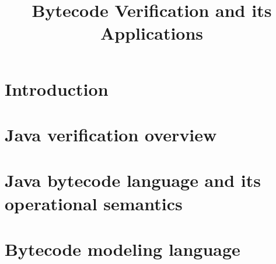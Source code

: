 \documentclass[book,10pt]{book}
\title{Bytecode Verification and its Applications}
\begin{document}
    \lstset{language=Jml}
    \lstset{frameround=tttt}

    \renewcommand{\topfraction}{0.9}
    \renewcommand{\textfraction}{0.05}
    \renewcommand{\floatpagefraction}{0.75}

\maketitle
\tableofcontents


\chapter{Introduction}
    
 
\chapter{Java verification overview}\label{javaVerif}
   
   
   
%   
   
   	  
   
   
\chapter{Java bytecode language and its operational semantics} \label{opSem:prelim}
     
   
   
   
   
   
   
   
   
   
   
  
   
  
   

\chapter{Bytecode modeling language} \label{bcsl}
  \lstset{numbers=left,numberstyle=\small,stepnumber=1,numbersep=5pt}
   
  
  
  
  
  

\end{document}
